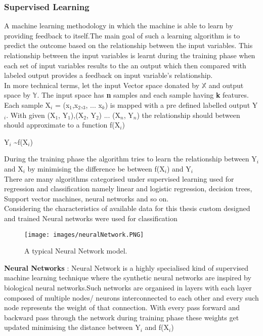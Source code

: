 \documentclass{article}
\begin{document}
\subsubsection {Supervised Learning} A machine learning methodology in which the machine is able to learn by providing feedback to itself.The main goal of such a learning algorithm is to predict the outcome based on the relationship between the input variables. This relationship between the input variables is learnt during the training phase when each set of input variables results to the an output which then compared with labeled output provides a feedback on input variable's relationship.\newline\\
In more technical terms, let the input Vector space donated by \(\mathbb{X}\) and output space by \(\mathbb{Y}\). The input space has \textbf{n} samples and each sample having \textbf{k} features. Each sample X$_{i}$ = (x$_{1}$,x$_{2}$,$_{3}$, ... x$_{k}$) is mapped with a pre defined labelled output Y$_{i}$. 
With given (X$_{1}$, Y$_{1}$),(X$_{2}$, Y$_{2}$) ... (X$_{n}$, Y$_{n}$) the relationship should between should approximate to a function f(X$_{i}$)\newline\\
\centerline{Y$_{i}$ \sim f(X$_{i}$)}\newline

During the training phase the algorithm tries to learn the relationship between Y$_{i}$ and X$_{i}$ by minimising the difference be between f(X$_{i}$) and Y$_{i}$
\\

There are many algorithms categorised under supervised learning used for regression and classification namely linear and logistic regression, decision trees, Support vector machines, neural networks and so on.\\

Considering the characteristics of available data for this thesis custom designed and trained Neural networks were used for classification \\

\begin{figure}[htp]
    \centering
    \texttt{[image: images/neuralNetwork.PNG]}
    \caption{A typical Neural Network model.}
    \label{fig: Neural Network}
\end{figure}

\textbf{Neural Networks} : Neural Network is a highly specialised kind of supervised machine learning technique where the synthetic neural networks are inspired by biological neural networks.Such networks are organised in layers with each layer composed of multiple nodes/ neurons interconnected to each other and every such node represents the weight of that connection. With every pass forward and backward pass through the network during training phase these weights get updated minimising the distance between Y$_{i}$ and f(X$_{i}$)
\end{document}
